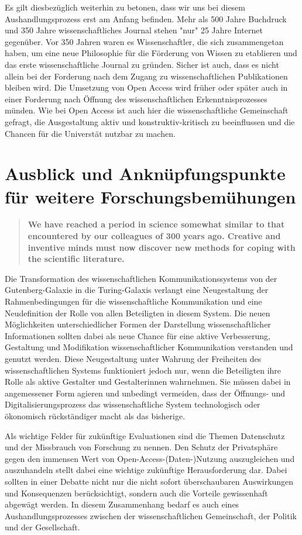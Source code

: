 Es gilt diesbezüglich weiterhin zu betonen, dass wir uns bei diesem Aushandlungsprozess erst am Anfang befinden. Mehr als 500 Jahre Buchdruck und 350 Jahre wissenschaftliches Journal stehen "nur" 25 Jahre Internet gegenüber. Vor 350 Jahren waren es Wissenschaftler, die sich zusammengetan haben, um eine neue Philosophie für die Förderung von Wissen zu etablieren und das erste wissenschaftliche Journal zu gründen. Sicher ist auch, dass es nicht allein bei der Forderung nach dem Zugang zu wissenschaftlichen Publikationen bleiben wird. Die Umsetzung von Open Access wird früher oder später auch in einer Forderung nach Öffnung des wissenschaftlichen Erkenntnisprozesses münden. Wie bei Open Access ist auch hier die wissenschaftliche Gemeinschaft gefragt, die Ausgestaltung aktiv und konstruktiv-kritisch zu beeinflussen und die Chancen für die Universtät nutzbar zu machen.

\section{Ausblick und Anknüpfungspunkte für weitere Forschungsbemühungen}

\begin{quote}
\textbf{We have reached a period in science somewhat similar to that encountered by our colleagues of 300 years ago. Creative and inventive minds must now discover new methods for coping with the scientific literature.}
\end{quote} \cite{porter_1964_scientific}

Die Transformation des wissenschaftlichen Kommunikationssystems von der Gutenberg-Galaxie in die Turing-Galaxis verlangt eine Neugestaltung der Rahmenbedingungen für die wissenschaftliche Kommunikation und eine Neudefinition der Rolle von allen Beteiligten in diesem System. Die neuen Möglichkeiten unterschiedlicher Formen der Darstellung wissenschaftlicher Informationen sollten dabei als neue Chance für eine aktive Verbesserung, Gestaltung und Modifikation wissenschaftlicher Kommunikation verstanden und genutzt werden. Diese Neugestaltung unter Wahrung der Freiheiten des wissenschaftlichen Systems funktioniert jedoch nur, wenn die Beteiligten ihre Rolle als aktive Gestalter und Gestalterinnen wahrnehmen. Sie müssen dabei in angemessener Form agieren und unbedingt vermeiden, dass der Öffnungs- und Digitalisierungsprozess das wissenschaftliche System technologisch oder ökonomisch rückständiger macht als das bisherige.

Als wichtige Felder für zukünftige Evaluationen sind die Themen Datenschutz und der Missbrauch von Forschung \cite{Fritsch_2015} zu nennen. Den Schutz der Privatsphäre gegen den immensen Wert von Open-Access-(Daten-)Nutzung auszugleichen und auszuhandeln stellt dabei eine wichtige zukünftige Herausforderung dar. Dabei sollten in einer Debatte nicht nur die nicht sofort überschaubaren Auswirkungen und Konsequenzen berücksichtigt, sondern auch die Vorteile gewissenhaft abgewägt werden. In diesem Zusammenhang bedarf es auch eines Aushandlungsprozesses zwischen der wissenschaftlichen Gemeinschaft, der Politik und der Gesellschaft.

